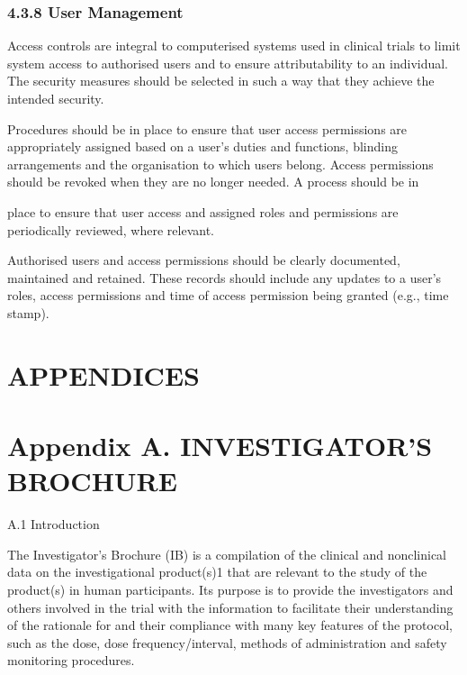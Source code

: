 \documentclass[11pt]{article}
\begin{document}
\subsubsection{4.3.8 User Management}

\begin{description}[leftmargin=2.5cm,style=sameline]

\item[(a)] Access controls are integral to computerised systems used in clinical trials to limit system access to authorised users and to ensure attributability to an individual. The security measures should be selected in such a way that they achieve the intended security.

\item[(b)] Procedures should be in place to ensure that user access permissions are appropriately assigned based on a user's duties and functions, blinding arrangements and the organisation to which users belong. Access permissions should be revoked when they are no longer needed. A process should be in

\end{description}

place to ensure that user access and assigned roles and permissions are periodically reviewed, where relevant.


\begin{description}[leftmargin=2.5cm,style=sameline]

\item[(c)] Authorised users and access permissions should be clearly documented, maintained and retained. These records should include any updates to a user's roles, access permissions and time of access permission being granted (e.g., time stamp).

\end{description}

\section{APPENDICES}

\section{Appendix A. INVESTIGATOR'S BROCHURE}

A.1 Introduction


The Investigator's Brochure (IB) is a compilation of the clinical and nonclinical data on the investigational product(s)1 that are relevant to the study of the product(s) in human participants. Its purpose is to provide the investigators and others involved in the trial with the information to facilitate their understanding of the rationale for and their compliance with many key features of the protocol, such as the dose, dose frequency/interval, methods of administration and safety monitoring procedures.
\end{document}
